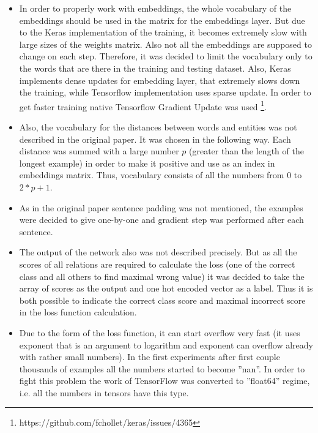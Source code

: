 \begin{itemize}
  \item In order to properly work with embeddings, the whole vocabulary of the embeddings 
  should be used in the matrix for the embeddings layer. But due to the Keras implementation of 
  the training, it becomes extremely slow with large sizes of the weights matrix. Also not all the 
  embeddings are supposed to change on each step. Therefore, it was decided to limit the vocabulary 
  only to the words that are there in the training and testing dataset. Also, Keras implements 
  dense updates for embedding layer, that extremely slows down the training, while Tensorflow 
  implementation uses sparse update. In order to get faster training native Tensorflow Gradient 
  Update was used \footnote{https://github.com/fchollet/keras/issues/4365}.
   \item Also, the vocabulary for the distances between words and entities was not described in the original paper. 
   It was chosen in the following way. Each distance was 
   summed with a large number $p$ (greater than the length of the 
  longest example) in order to make it positive and use as an index in embeddings 
  matrix. Thus, vocabulary consists of all the numbers from 0 to $2*p + 1$.
   \item As in the original paper sentence padding was not mentioned, the examples were decided 
  to give one-by-one and gradient step was performed after each sentence.
  \item The output of the network also was not described precisely. But as all the scores of all relations 
  are required to calculate the loss (one of the correct class and all others to find maximal wrong 
  value) it was decided to take the array of scores as the output and one hot encoded vector as a 
  label. Thus it is both possible to indicate the correct class score and maximal incorrect score in 
  the loss function calculation.
  \item Due to the form of the loss function, it can start overflow very fast (it uses exponent that is 
  an argument to logarithm and exponent can overflow already with rather small numbers). In the 
  first experiments 
  after first couple thousands of examples all the numbers started to become ''nan''. In order to fight this problem the work of TensorFlow was converted to ''float64'' regime, i.e. all the numbers 
  in tensors have this type.
\end{itemize}

